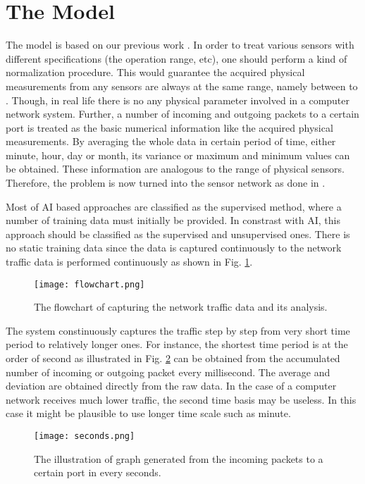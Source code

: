 \documentclass[conference,10pt,a4paper]{IEEEtran}
\begin{document}
\section{The Model}
\label{sec:model}

The model is based on our previous work \cite{arya}. In order to treat various sensors with different specifications (the operation range, etc), one should perform a kind of normalization procedure. This would guarantee the acquired physical measurements from any sensors are always at the same range, namely between  to . Though, in real life there is no any physical parameter involved in a computer network system. Further,  a number of incoming and outgoing packets to a certain port is treated as the basic numerical information like the acquired physical measurements. By averaging the whole data in certain period of time, either minute, hour, day or month, its variance or maximum and minimum values can be obtained. These information are analogous to the range of physical sensors. Therefore, the problem is now turned into the sensor network as done in 
 \cite{arya}.
 
Most of AI based approaches are classified as the supervised method, where a number of training data must initially be provided. In constrast with AI, this approach should be classified as the supervised and unsupervised ones. There is no static training data since the data is captured continuously to the network traffic data is performed continuously as shown in Fig. \ref{fig:flowchart}.

\begin{figure}[t!]
 \centering
 \texttt{[image: flowchart.png]}
\caption{The flowchart of capturing the network traffic data and its analysis.}
\label{fig:flowchart}
\end{figure}

The system constinuously captures the traffic step by step from very short time period to relatively longer ones. 
For instance,  the shortest time period is at the order of second as illustrated in Fig. \ref{fig:seconds} can be obtained from the accumulated number of incoming or outgoing packet every millisecond. The average and deviation are obtained directly from the raw data. In the case of a computer network receives much lower traffic, the second time basis may be useless. In this case it might be plausible to use longer time scale such as minute.

\begin{figure}[b!]
 \centering
 \texttt{[image: seconds.png]}
\caption{The illustration of graph generated from the incoming packets to a certain port in every seconds.}
\label{fig:seconds}
\end{figure}
\end{document}
